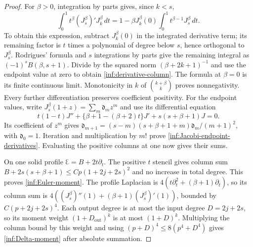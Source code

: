 \begin{proof}
For $\beta>0$, integration by parts gives, since $k<s$,
\[
 \int_0^1t^\beta(J_s^\beta)'J_k^\beta\,dt
 =1-\beta J_k^\beta(0)\int_0^1t^{\beta-1}J_s^\beta\,dt.
\]
To obtain this expression, subtract $J_k^\beta(0)$ in the
integrated derivative term; its remaining factor is $t$ times a
polynomial of degree below $s$, hence orthogonal to $J_s^\beta$.
Rodrigues' formula and $s$ integrations by parts give the remaining
integral as $(-1)^sB(\beta,s+1)$.
Divide by the squared norm $(\beta+2k+1)^{-1}$ and use the endpoint
value at zero to obtain \eqref{inf:derivative-column}.
The formula at $\beta=0$ is its finite continuous limit.
Monotonicity in $k$ of $\binom{k+\beta}{k}$ proves nonnegativity.
Every further differentiation preserves coefficient positivity.
For the endpoint values, write $J_s^\beta(1+z)=\sum_m\mathfrak d_mz^m$
and use its differential equation
\[
 t(1-t)J''+\{\beta+1-(\beta+2)t\}J'
                      +s(s+\beta+1)J=0.
\]
Its coefficient of $z^m$ gives
$\mathfrak d_{m+1}=(s-m)(s+\beta+1+m)\mathfrak d_m/(m+1)^2$,
with $\mathfrak d_0=1$.
Iteration and multiplication by $m!$ prove
\eqref{inf:Jacobi-endpoint-derivatives}. Evaluating the positive
columns at one now gives their sums.

On one solid profile $\Euler=B+2t\partial_t$.
The positive $t$ stencil gives column sum
$B+2s(s+\beta+1)\le Cp(1+2j+2s)^2$ and no increase in total degree.
This proves \eqref{inf:Euler-moment}.
The profile Laplacian is $4(t\partial_t^2+(\beta+1)\partial_t)$,
so its column sum is
$4((J_s^\beta)''(1)+(\beta+1)(J_s^\beta)'(1))$,
bounded by $C(p+2j+2s)^4$.
Each output degree is at most the input degree $D=2j+2s$, so
its moment weight $(1+D_{\mathrm{out}})^k$ is at most $(1+D)^k$.
Multiplying the column bound by this weight and using
$(p+D)^4\le8(p^4+D^4)$ gives \eqref{inf:Delta-moment} after
absolute summation.
\end{proof}
